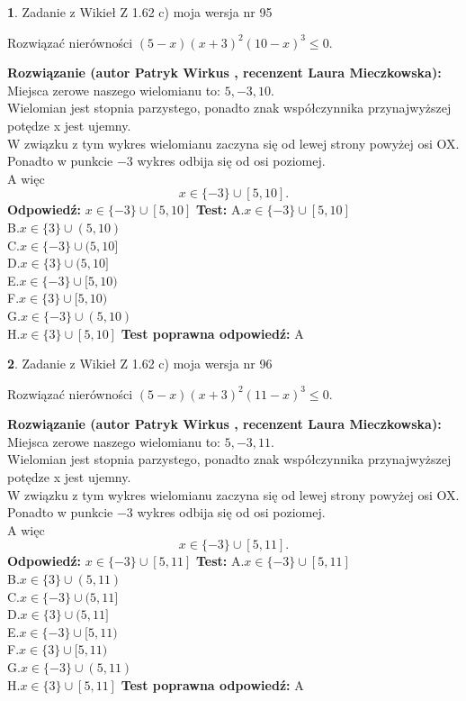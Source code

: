 \documentclass[12pt, a4paper]{article}
\theoremstyle{definition} %
\newtheorem{zad}{}
\newcommand{\zadStart}[1]{\begin{zad}#1\newline}
\newcommand{\zadStop}{\end{zad}}
\newcommand{\rozwStart}[2]{\noindent \textbf{Rozwiązanie (autor #1 , recenzent #2): }\newline}
\newcommand{\rozwStop}{\newline}
\newcommand{\odpStart}{\noindent \textbf{Odpowiedź:}\newline}
\newcommand{\odpStop}{\newline}
\newcommand{\testStart}{\noindent \textbf{Test:}\newline}
\newcommand{\testStop}{\newline}
\newcommand{\kluczStart}{\noindent \textbf{Test poprawna odpowiedź:}\newline}
\newcommand{\kluczStop}{\newline}
\begin{document}
\zadStart{Zadanie z Wikieł Z 1.62 c) moja wersja nr 95}

Rozwiązać nierówności $(5-x)(x+3)^{2}(10-x)^{3}\le0$.
\zadStop
\rozwStart{Patryk Wirkus}{Laura Mieczkowska}
Miejsca zerowe naszego wielomianu to: $5, -3, 10$.\\
Wielomian jest stopnia parzystego, ponadto znak współczynnika przy\linebreak najwyższej potędze x jest ujemny.\\ W związku z tym wykres wielomianu zaczyna się od lewej strony powyżej osi OX.\\
Ponadto w punkcie $-3$ wykres odbija się od osi poziomej.\\
A więc $$x \in \{-3\} \cup [5,10].$$
\rozwStop
\odpStart
$x \in \{-3\} \cup [5,10]$
\odpStop
\testStart
A.$x \in \{-3\} \cup [5,10]$\\
B.$x \in \{3\} \cup (5,10)$\\
C.$x \in \{-3\} \cup (5,10]$\\
D.$x \in \{3\} \cup (5,10]$\\
E.$x \in \{-3\} \cup [5,10)$\\
F.$x \in \{3\} \cup [5,10)$\\
G.$x \in \{-3\} \cup (5,10)$\\
H.$x \in \{3\} \cup [5,10]$
\testStop
\kluczStart
A
\kluczStop



\zadStart{Zadanie z Wikieł Z 1.62 c) moja wersja nr 96}

Rozwiązać nierówności $(5-x)(x+3)^{2}(11-x)^{3}\le0$.
\zadStop
\rozwStart{Patryk Wirkus}{Laura Mieczkowska}
Miejsca zerowe naszego wielomianu to: $5, -3, 11$.\\
Wielomian jest stopnia parzystego, ponadto znak współczynnika przy\linebreak najwyższej potędze x jest ujemny.\\ W związku z tym wykres wielomianu zaczyna się od lewej strony powyżej osi OX.\\
Ponadto w punkcie $-3$ wykres odbija się od osi poziomej.\\
A więc $$x \in \{-3\} \cup [5,11].$$
\rozwStop
\odpStart
$x \in \{-3\} \cup [5,11]$
\odpStop
\testStart
A.$x \in \{-3\} \cup [5,11]$\\
B.$x \in \{3\} \cup (5,11)$\\
C.$x \in \{-3\} \cup (5,11]$\\
D.$x \in \{3\} \cup (5,11]$\\
E.$x \in \{-3\} \cup [5,11)$\\
F.$x \in \{3\} \cup [5,11)$\\
G.$x \in \{-3\} \cup (5,11)$\\
H.$x \in \{3\} \cup [5,11]$
\testStop
\kluczStart
A
\kluczStop
\end{document}
